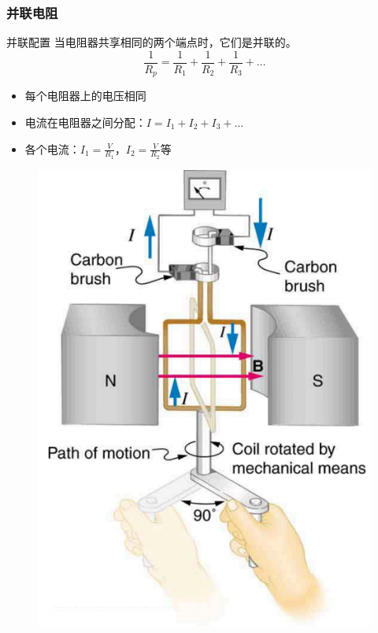 \documentclass{beamer}
\begin{document}
\begin{frame}
    \frametitle{并联电阻}
    \begin{block}{并联配置}
        当电阻器共享相同的两个端点时，它们是并联的。
        \[ \frac{1}{R_p} = \frac{1}{R_1} + \frac{1}{R_2} + \frac{1}{R_3} + \ldots \]
    \end{block}
    \begin{itemize}
        \item 每个电阻器上的电压相同
        \item 电流在电阻器之间分配：$I = I_1 + I_2 + I_3 + \ldots$
        \item 各个电流：$I_1 = \frac{V}{R_1}$，$I_2 = \frac{V}{R_2}$等
    \end{itemize}
    \begin{center}
        \begin{figure}
            \centering
            \includegraphics[width=0.5\linewidth]{image.png}
        \end{figure}
    \end{center}
\end{frame}
\end{document}
